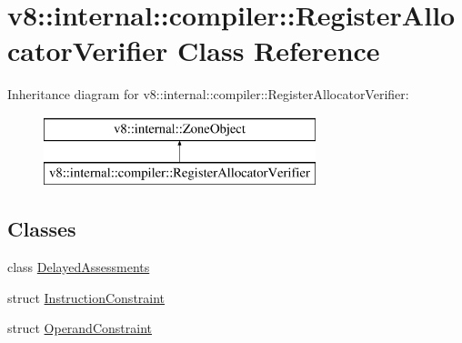 \hypertarget{classv8_1_1internal_1_1compiler_1_1_register_allocator_verifier}{}\section{v8\+:\+:internal\+:\+:compiler\+:\+:Register\+Allocator\+Verifier Class Reference}
\label{classv8_1_1internal_1_1compiler_1_1_register_allocator_verifier}
Inheritance diagram for v8\+:\+:internal\+:\+:compiler\+:\+:Register\+Allocator\+Verifier\+:\begin{figure}[H]
\begin{center}
\leavevmode
\includegraphics[height=2.000000cm]{classv8_1_1internal_1_1compiler_1_1_register_allocator_verifier}
\end{center}
\end{figure}
\subsection*{Classes}
\begin{DoxyCompactItemize}
\item 
class \hyperlink{classv8_1_1internal_1_1compiler_1_1_register_allocator_verifier_1_1_delayed_assessments}{Delayed\+Assessments}
\item 
struct \hyperlink{structv8_1_1internal_1_1compiler_1_1_register_allocator_verifier_1_1_instruction_constraint}{Instruction\+Constraint}
\item 
struct \hyperlink{structv8_1_1internal_1_1compiler_1_1_register_allocator_verifier_1_1_operand_constraint}{Operand\+Constraint}
\end{DoxyCompactItemize}
